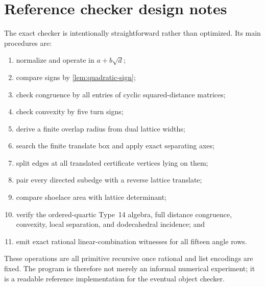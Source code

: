 \documentclass[11pt]{article}
\theoremstyle{remark}
\begin{document}
\section{Reference checker design notes}

The exact checker is intentionally straightforward rather than optimized.  Its
main procedures are:

\begin{enumerate}
\item normalize and operate in \(a+b\sqrt d\);
\item compare signs by \cref{lem:quadratic-sign};
\item check congruence by all entries of cyclic squared-distance matrices;
\item check convexity by five turn signs;
\item derive a finite overlap radius from dual lattice widths;
\item search the finite translate box and apply exact separating axes;
\item split edges at all translated certificate vertices lying on them;
\item pair every directed subedge with a reverse lattice translate;
\item compare shoelace area with lattice determinant;
\item verify the ordered-quartic Type~14 algebra, full distance congruence,
convexity, local separation, and dodecahedral incidence; and
\item emit exact rational linear-combination witnesses for all fifteen angle
rows.
\end{enumerate}

These operations are all primitive recursive once rational and list encodings
are fixed.  The program is therefore not merely an informal numerical
experiment; it is a readable reference implementation for the eventual object
checker.
\end{document}
